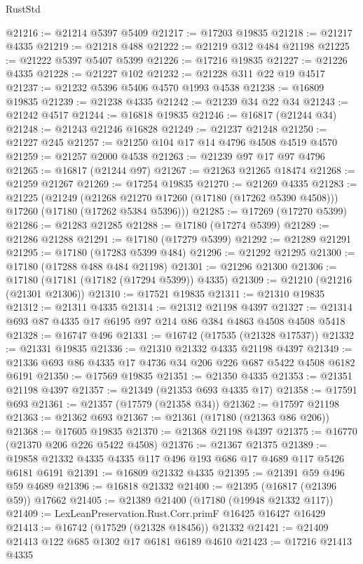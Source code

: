 \begin{lexlean}{RustStd}
\begin{coremodule}
@21216 := @21214 @5397 @5409
@21217 := @17203 @19835
@21218 := @21217 @4335
@21219 := @21218 @488
@21222 := @21219 @312 @484 @21198
@21225 := @21222 @5397 @5407 @5399
@21226 := @17216 @19835
@21227 := @21226 @4335
@21228 := @21227 @102
@21232 := @21228 @311 @22 @19 @4517
@21237 := @21232 @5396 @5406 @4570 @1993 @4538
@21238 := @16809 @19835
@21239 := @21238 @4335
@21242 := @21239 @34 @22 @34
@21243 := @21242 @4517
@21244 := @16818 @19835
@21246 := @16817 (@21244 @34)
@21248 := @21243 @21246 @16828
@21249 := @21237 @21248
@21250 := @21227 @245
@21257 := @21250 @104 @17 @14 @4796 @4508 @4519 @4570
@21259 := @21257 @2000 @4538
@21263 := @21239 @97 @17 @97 @4796
@21265 := @16817 (@21244 @97)
@21267 := @21263 @21265 @18474
@21268 := @21259 @21267
@21269 := @17254 @19835
@21270 := @21269 @4335
@21283 := @21225
    (@21249
      (@21268 @21270 @17260 (@17180 (@17262 @5390 @4508)))
      @17260
      (@17180 (@17262 @5384 @5396)))
@21285 := @17269 (@17270 @5399)
@21286 := @21283 @21285
@21288 := @17180 (@17274 @5399)
@21289 := @21286 @21288
@21291 := @17180 (@17279 @5399)
@21292 := @21289 @21291
@21295 := @17180 (@17283 @5399 @484)
@21296 := @21292 @21295
@21300 := @17180 (@17288 @488 @484 @21198)
@21301 := @21296 @21300
@21306 := @17180 (@17181 (@17182 (@17294 @5399)) @4335)
@21309 := @21210 (@21216 (@21301 @21306))
@21310 := @17521 @19835
@21311 := @21310 @19835
@21312 := @21311 @4335
@21314 := @21312 @21198 @4397
@21327 := @21314 @693 @87 @4335 @17 @6195 @97 @214 @86 @384 @4863 @4508 @4508 @5418
@21328 := @16747 @496
@21331 := @16742 (@17535 (@21328 @17537))
@21332 := @21331 @19835
@21336 := @21310 @21332 @4335 @21198 @4397
@21349 := @21336 @693 @86 @4335 @17 @4736 @34 @206 @226 @687 @5422 @4508 @6182 @6191
@21350 := @17569 @19835
@21351 := @21350 @4335
@21353 := @21351 @21198 @4397
@21357 := @21349 (@21353 @693 @4335 @17)
@21358 := @17591 @693
@21361 := @21357 (@17579 (@21358 @34))
@21362 := @17597 @21198
@21363 := @21362 @693
@21367 := @21361 (@17180 (@21363 @86 @206))
@21368 := @17605 @19835
@21370 := @21368 @21198 @4397
@21375 := @16770 (@21370 @206 @226 @5422 @4508)
@21376 := @21367 @21375
@21389 := @19858 @21332 @4335 @4335 @117 @496 @193 @686 @17 @4689 @117 @5426 @6181 @6191
@21391 := @16809 @21332 @4335
@21395 := @21391 @59 @496 @59 @4689
@21396 := @16818 @21332
@21400 := @21395 (@16817 (@21396 @59)) @17662
@21405 := @21389 @21400 (@17180 (@19948 @21332 @117))
@21409 := LexLeanPreservation.Rust.Corr.primF @16425 @16427 @16429
@21413 := @16742 (@17529 (@21328 @18456)) @21332
@21421 := @21409 @21413 @122 @685 @1302 @17 @6181 @6189 @4610
@21423 := @17216 @21413 @4335

\end{coremodule}
\end{lexlean}
